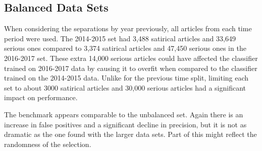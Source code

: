 \documentclass [12 pt] {report}
\begin{document}
\subsection{Balanced Data Sets}
When considering the separations by year previously, all articles from each time period were used. The 2014-2015 set had 3,488 satirical articles and 33,649 serious ones compared to 3,374 satirical articles and 47,450 serious ones in the 2016-2017 set. These extra 14,000 serious articles could have affected the classifier trained on 2016-2017 data by causing it to overfit when compared to the classifier trained on the 2014-2015 data. Unlike for the previous time split, limiting each set to about 3000 satirical articles and 30,000 serious articles had a significant impact on performance.
\vspace*{-2mm}
\begin{table}[H]
\footnotesize
{}
\label{table:SVM 2014-2015 Train, 2016-2017 Test, Balanced}
\end{table}

\vspace*{-2mm}
\begin{table}[H]
\small
{}
\label{table:Train 2014-2015, Test 2016-2017 Confusion, Balanced}
\end{table}
\FloatBarrier
The benchmark appears comparable to the unbalanced set. Again there is an increase in false positives and a significant decline in precision, but it is not as dramatic as the one found with the larger data sets. Part of this might reflect the randomness of the selection.
\end{document}
